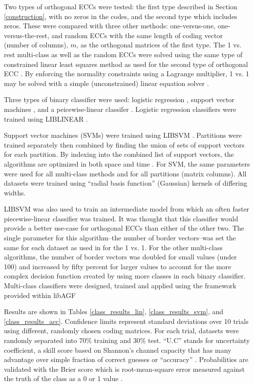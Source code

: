 {\revision
Two types of orthogonal ECCs were tested: the first type described in
Section \ref{construction}, with no zeros in the codes, and the second type which includes
zeros.
These were compared with three other methods: one-versus-one, one-versus-the-rest,
and random ECCs with the same length of coding vector (number of columns), $m$,
as the orthogonal matrices of the first type.
The 1 vs. rest multi-class as well as the random ECCs were solved using 
the same type of constrained linear least squares method as used for the
second type of orthogonal ECC \citep{Lawson_Hanson1995}.
By enforcing the normality constraints using a Lagrange multiplier,
1 vs. 1 may be solved with a simple (unconstrained) linear equation solver \citep{Wu_etal2004}.}

{\revision
Three types of binary classifier were used: logistic regression \citep{Michie_etal1994},
support vector machines \citep{Mueller_etal2001},
and a peicewise-linear classifer \citep{Mills2018}.
Logistic regression classifiers were trained using LIBLINEAR \citep{Fan_etal2008}.}

{\revision Support vector machines (SVMs) were trained using
LIBSVM \citep{Chang_Lin2011}.}
Partitions were trained separately then combined by finding the union of
sets of support vectors for each partition.
By indexing into the combined list of support vectors, the algorithms are
optimized in both space and time \citep{Chang_Lin2011}.
For SVM, the same parameters were used for all multi-class methods and
for all partitions (matrix columns).
All datasets were trained using  ``radial basis function'' (Gaussian)
kernels of differing widths.

{\revision
LIBSVM was also used to train an intermediate model from which an often faster 
piecewise-linear classifier \citep{Mills2018} was trained.
It was thought that this classifier would provide a better use-case for orthogonal
ECCs than either of the other two.
The single parameter for this algorithm--the number of border vectors--was set 
the same for each dataset as used in \citet{Mills2018} for the 1 vs. 1. 
For the other multi-class algorithms, the number of border vectors
was doubled for small values (under 100) and increased by fifty percent
for larger values to account for the more complex decision function
created by using more classes in each binary classifier.
Multi-class classifiers were designed, trained and applied using the
framework provided within libAGF \citep{Mills2018,Mills2011,Mills2018a}
}

Results are shown in {\revision Tables \ref{class_results_lin}, \ref{class_results_svm},
and \ref{class_results_acc}.}
Confidence limits represent standard deviations over 10 trials using
different, randomly chosen coding matrices.
For each trial, datasets were randomly separated into 70\% training and 30\%
test.
``U.C'' stands for uncertainty
coefficient, a skill score based on Shannon's channel capacity
that has many advantage over simple
fraction of correct guesses or ``accuracy''
\citep{Mills2011,Shannon,Press_etal1992}.
Probabilities are validated with the Brier score 
which is root-mean-square
error measured against the truth of the class as a 0 or 1 value
\citep{Brier1950,Jolliffe_Stephenson2003}.

